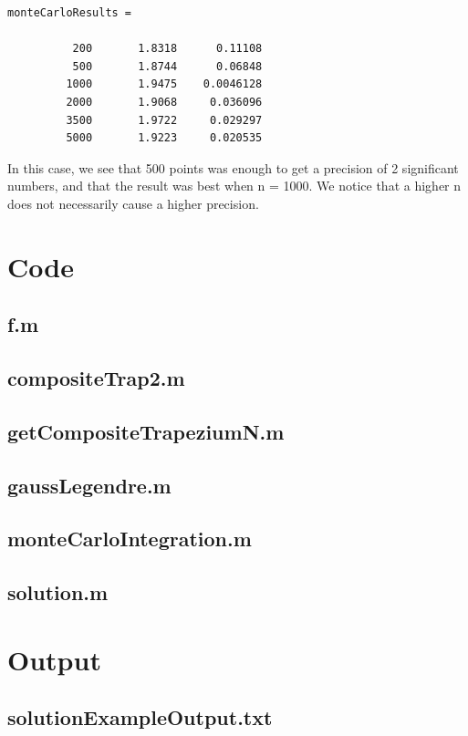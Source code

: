 \documentclass[11pt, a4paper, titlepage, openright]{article}
\begin{document}
\begin{lstlisting}
monteCarloResults =

          200       1.8318      0.11108
          500       1.8744      0.06848
         1000       1.9475    0.0046128
         2000       1.9068     0.036096
         3500       1.9722     0.029297
         5000       1.9223     0.020535
\end{lstlisting}
In this case, we see that 500 points was enough to get a precision of 2 significant numbers,
and that the result was best when n = 1000. We notice that a higher n does not necessarily cause a higher precision.

\onecolumn
\appendix
\appendixpage
\addappheadtotoc

\section{Code}
	\subsection{f.m}
		
	\bigskip
	\subsection{compositeTrap2.m}
		
	\bigskip
	\subsection{getCompositeTrapeziumN.m}
		
	\bigskip
	\subsection{gaussLegendre.m}
		
	\bigskip
	\subsection{monteCarloIntegration.m}
		
	\bigskip
	\subsection{solution.m}
		
	\bigskip
\section{Output}
	\subsection{solutionExampleOutput.txt}
		
	\bigskip
\newpage
		
\end{document}
